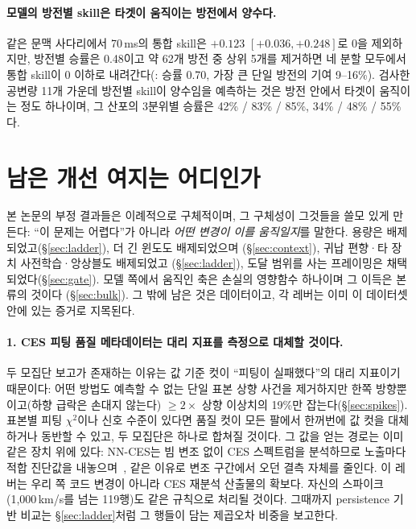 \documentclass[10pt,a4paper]{article}
\begin{document}
\paragraph{모델의 방전별 skill은 타겟이 움직이는 방전에서 양수다.}
같은 문맥 사다리에서 70\,ms의 통합 \Vrot{} skill은 $+0.123$ $[+0.036, +0.248]$로 0을
제외하지만, 방전별 승률은 0.48이고 약 62개 방전 중 상위 5개를 제거하면 네 분할
모두에서 통합 skill이 0 이하로 내려간다(\Ti{}: 승률 0.70, 가장 큰 단일 방전의 기여
9--16\%). 검사한 공변량 11개 가운데 방전별 skill이 양수임을 예측하는 것은 방전 안에서
타겟이 움직이는 정도 하나이며, 그 산포의 3분위별 승률은 \Ti{} 42\% / 83\% / 85\%,
\Vrot{} 34\% / 48\% / 55\%다.

\section{남은 개선 여지는 어디인가}
\label{sec:headroom}

본 논문의 부정 결과들은 이례적으로 구체적이며, 그 구체성이 그것들을 쓸모 있게
만든다: ``이 문제는 어렵다''가 아니라 \emph{어떤 변경이 이를 움직일지}를 말한다.
용량은 배제되었고(\S\ref{sec:ladder}), 더 긴 윈도도 배제되었으며
(\S\ref{sec:context}), 귀납 편향·타 장치 사전학습·앙상블도 배제되었고
(\S\ref{sec:ladder}), 도달 범위를 사는 프레이밍은 채택되었다(\S\ref{sec:gate}).
모델 쪽에서 움직인 축은 손실의 영향함수 하나이며 그 이득은 본류의 것이다
(\S\ref{sec:bulk}). 그 밖에 남은 것은 데이터이고, 각 레버는 이미 이 데이터셋 안에
있는 증거로 지목된다.

\paragraph{1. CES 피팅 품질 메타데이터는 대리 지표를 측정으로 대체할 것이다.}
두 모집단 보고가 존재하는 이유는 값 기준 컷이 ``피팅이 실패했다''의 대리 지표이기
때문이다: 어떤 방법도 예측할 수 없는 단일 표본 상향 사건을 제거하지만 한쪽
방향뿐이고(하향 급락은 손대지 않는다) $\geq 2\times$ 상향 이상치의 19\%만
잡는다(\S\ref{sec:spikes}). 표본별 피팅 $\chi^2$이나 신호 수준이 있다면 품질 컷이
모든 팔에서 한꺼번에 값 컷을 대체하거나 동반할 수 있고, 두 모집단은 하나로 합쳐질
것이다. 그 값을 얻는 경로는 이미 같은 장치 위에 있다: NN-CES는 빔 변조 없이 CES
스펙트럼을 분석하므로 노출마다 적합 진단값을 내놓으며~\citep{Lee2026NeuralNetworkbased},
같은 이유로 변조 구간에서 오던 결측 자체를 줄인다. 이 레버는 우리 쪽 코드 변경이
아니라 CES 재분석 산출물의 확보다. \Vrot{} 자신의 스파이크(1{,}000\,km/s를 넘는 119행)도 같은 규칙으로
처리될 것이다. 그때까지 persistence 기반 \Vrot{} 비교는 \S\ref{sec:ladder}처럼 그
행들이 담는 제곱오차 비중을 보고한다.
\end{document}
